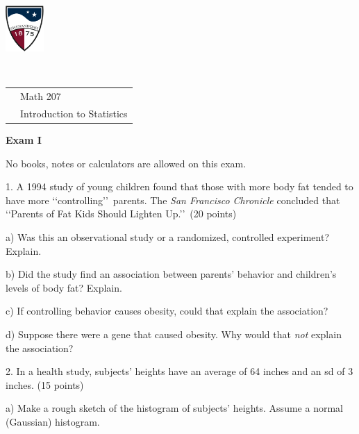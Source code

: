\documentclass[10pt]{article}
\begin{document}
\pagestyle{empty}
\lstset{language=R, showspaces=false, showstringspaces=false}

\href{http://www.su.edu}{\includegraphics[height=1.75cm]{sulogo.eps}}
\vspace{-1.69cm}

{{\ }\hfill\small
\begin{tabular}{cl}
& Math 207\\
& Introduction to Statistics\\
\end{tabular}
}
\setlength{\baselineskip}{1.05\baselineskip}
\bigskip

\begin{center}
\textbf{\large  Exam I}
\end{center}
No books, notes or calculators  are allowed on this exam.
\bigskip

1. A 1994 study of young children found that those with more body fat tended to have
more \lq\lq controlling\rq\rq\ parents.  The \textit{San Francisco Chronicle}  
concluded that \lq\lq Parents of Fat Kids Should Lighten Up.\rq\rq\ (20 points)

\hspace{10pt} a) Was this an observational study or a randomized, controlled experiment?
Explain.
\vspace{.9in}

\hspace{10pt} b) Did the study find an association between parents' behavior
and children's levels of body fat?  Explain.
\vspace{.7in}

\hspace{10pt} c) If controlling behavior causes obesity, could that explain the association?
\vspace{1in}


\hspace{10pt} d) Suppose there were a gene that caused obesity. Why would that \textit{not} explain
the association? 
\vspace{1in}


2. In a health study, subjects' heights have an average of  64 inches and an sd of 3 inches.
(15 points)

\hspace{10pt} a) Make a rough sketch of the histogram of subjects' heights.
Assume a normal (Gaussian) histogram.
\vspace{1.5in}
\end{document}
